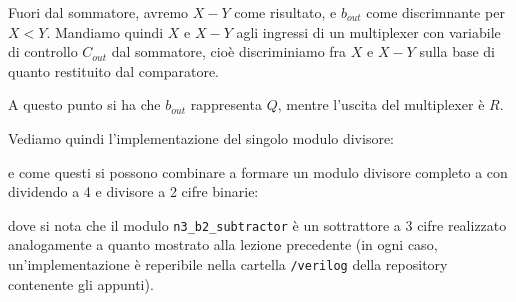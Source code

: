 \documentclass[a4paper,11pt]{article}
\begin{document}
Fuori dal sommatore, avremo $X-Y$ come risultato, e $b_{out}$ come discrimnante per $X < Y$.
Mandiamo quindi $X$ e $X-Y$ agli ingressi di un multiplexer con variabile di controllo $C_{out}$ dal sommatore,
cioè discriminiamo fra $X$ e $X-Y$ sulla base di quanto restituito dal comparatore.

A questo punto si ha che $b_{out}$ rappresenta $Q$, mentre l'uscita del multiplexer è $R$.

Vediamo quindi l'implementazione del singolo modulo divisore:



e come questi si possono combinare a formare un modulo divisore completo a con dividendo a 4 e divisore a 2 cifre binarie:



dove si nota che il modulo \lstinline|n3_b2_subtractor| è un sottrattore a 3 cifre realizzato analogamente a quanto mostrato alla lezione precedente (in ogni caso, un'implementazione è reperibile nella cartella \lstinline|/verilog| della repository contenente gli appunti).
\end{document}
